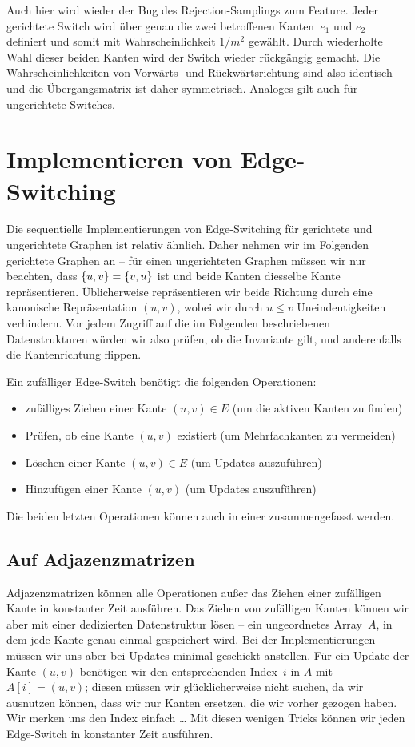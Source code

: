 Auch hier wird wieder der Bug des Rejection-Samplings zum Feature.
Jeder gerichtete Switch wird über genau die zwei betroffenen Kanten~$e_1$ und $e_2$ definiert und somit mit Wahrscheinlichkeit $1/m^2$ gewählt.
Durch wiederholte Wahl dieser beiden Kanten wird der Switch wieder rückgängig gemacht.
Die Wahrscheinlichkeiten von Vorwärts- und Rückwärtsrichtung sind also identisch und die Übergangsmatrix ist daher symmetrisch.
Analoges gilt auch für ungerichtete Switches.

\section{Implementieren von Edge-Switching}
Die sequentielle Implementierungen von Edge-Switching für gerichtete und ungerichtete Graphen ist relativ ähnlich.
Daher nehmen wir im Folgenden gerichtete Graphen an -- für einen ungerichteten Graphen müssen wir nur beachten, dass $\left\{u, v\right\} = \left\{v, u\right\}$ ist und beide Kanten diesselbe Kante repräsentieren.
Üblicherweise repräsentieren wir beide Richtung durch eine kanonische Repräsentation $(u, v)$, wobei wir \zB durch $u \le v$ Uneindeutigkeiten verhindern.
Vor jedem Zugriff auf die im Folgenden beschriebenen Datenstrukturen würden wir also prüfen, ob die Invariante gilt, und anderenfalls die Kantenrichtung flippen.

Ein zufälliger Edge-Switch benötigt die folgenden Operationen:
\begin{itemize}
    \item zufälliges Ziehen einer Kante $(u,v) \in E$ (um die aktiven Kanten zu finden)
    \item Prüfen, ob eine Kante $(u, v)$ existiert (um Mehrfachkanten zu vermeiden)
    \item Löschen einer Kante $(u, v) \in E$ (um Updates auszuführen)
    \item Hinzufügen einer Kante $(u, v)$ (um Updates auszuführen)
\end{itemize}

Die beiden letzten Operationen können auch in einer zusammengefasst werden.

\subsection{Auf Adjazenzmatrizen}
Adjazenzmatrizen können alle Operationen außer das Ziehen einer zufälligen Kante in konstanter Zeit ausführen.
Das Ziehen von zufälligen Kanten können wir aber mit einer dedizierten Datenstruktur lösen --
\zB ein ungeordnetes Array~$A$, in dem jede Kante genau einmal gespeichert wird.
Bei der Implementierungen müssen wir uns aber bei Updates minimal geschickt anstellen.
Für ein Update der Kante $(u,v)$ benötigen wir den entsprechenden Index~$i$ in $A$ mit $A[i] = (u,v)$;
diesen müssen wir glücklicherweise nicht suchen, da wir ausnutzen können, dass wir nur Kanten ersetzen, die wir vorher gezogen haben.
Wir merken uns den Index einfach \dots{}
Mit diesen wenigen Tricks können wir jeden Edge-Switch in konstanter Zeit ausführen.

